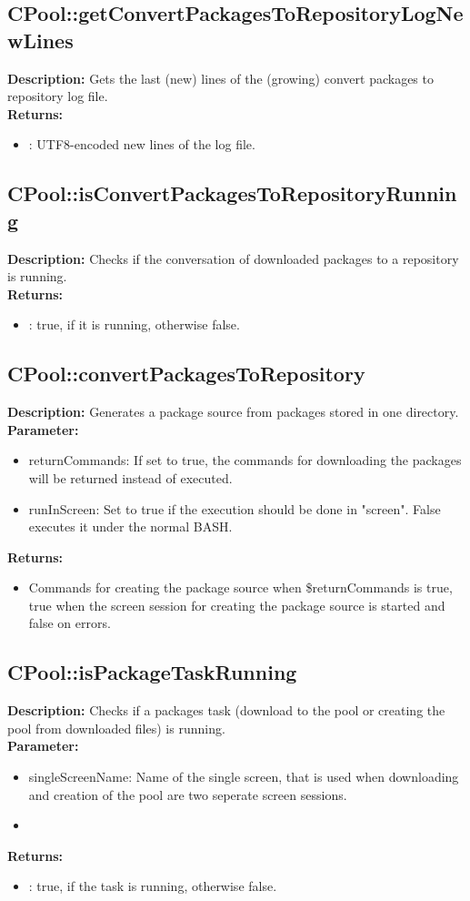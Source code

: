 \subsection{CPool::getConvertPackagesToRepositoryLogNewLines}
\textbf{Description:} Gets the last (new) lines of the (growing) convert packages to repository log file.\\
\textbf{Returns:}
\begin{itemize}
\item : UTF8-encoded new lines of the log file.
\end{itemize}

\subsection{CPool::isConvertPackagesToRepositoryRunning}
\textbf{Description:} Checks if the conversation of downloaded packages to a repository is running.\\
\textbf{Returns:}
\begin{itemize}
\item : true, if it is running, otherwise false.
\end{itemize}

\subsection{CPool::convertPackagesToRepository}
\textbf{Description:} Generates a package source from packages stored in one directory.\\
\textbf{Parameter:}
\begin{itemize}
\item returnCommands: If set to true, the commands for downloading the packages will be returned instead of executed.
\item runInScreen: Set to true if the execution should be done in "screen". False executes it under the normal BASH.
\end{itemize}
\textbf{Returns:}
\begin{itemize}
\item Commands for creating the package source when \$returnCommands is true, true when the screen session for creating the package source is started and false on errors.
\end{itemize}

\subsection{CPool::isPackageTaskRunning}
\textbf{Description:} Checks if a packages task (download to the pool or creating the pool from downloaded files) is running.\\
\textbf{Parameter:}
\begin{itemize}
\item singleScreenName: Name of the single screen, that is used when downloading and creation of the pool are two seperate screen sessions.
\item 
\end{itemize}
\textbf{Returns:}
\begin{itemize}
\item : true, if the task is running, otherwise false.
\end{itemize}

